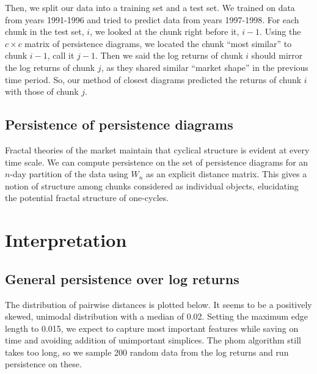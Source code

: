 \documentclass{article}
\begin{document}
Then, we split our data into a training set and a test set. We trained on data from years 1991-1996 and tried to predict data from years 1997-1998. For each chunk in the test set, $i$, we looked at the chunk right before it, $i-1$. Using the $c \times c$ matrix of persistence diagrams, we located the chunk “most similar” to chunk $i-1$, call it $j-1$. Then we said the log returns of chunk $i$ should mirror the log returns of chunk $j$, as they shared similar “market shape” in the previous time period. So, our method of closest diagrams predicted the returns of chunk $i$ with those of chunk $j$. 


\subsection{Persistence of persistence diagrams}
Fractal theories of the market maintain that cyclical structure is evident at every time scale. We can compute persistence on the set of persistence diagrams for an $n$-day partition of the data using $W_n$ as an explicit distance matrix. This gives a notion of structure among chunks considered as individual objects, elucidating the potential fractal structure of one-cycles.


\section{Interpretation}

\subsection{General persistence over log returns}

The distribution of pairwise distances is plotted below. It seems to be a positively skewed, unimodal distribution with a median of 0.02. Setting the maximum edge length to 0.015, we expect to capture most important features while saving on time and avoiding addition of unimportant simplices. The phom algorithm still takes too long, so we sample 200 random data from the log returns and run persistence on these.
\end{document}
